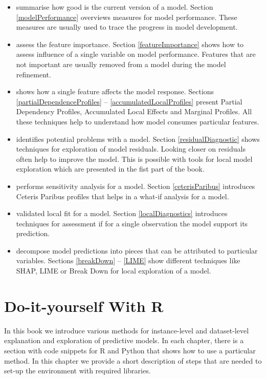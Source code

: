\documentclass[12pt,]{krantz}
\providecommand{\tightlist}{%
  \setlength{\itemsep}{0pt}\setlength{\parskip}{0pt}}
\begin{document}
\begin{itemize}
\tightlist
\item
  summarise how good is the current version of a model. Section \ref{modelPerformance} overviews measures for model performance. These measures are usually used to trace the progress in model development.
\item
  assess the feature importance. Section \ref{featureImportance} shows how to assess influence of a single variable on model performance. Features that are not important are usually removed from a model during the model refinement.
\item
  shows how a single feature affects the model response. Sections \ref{partialDependenceProfiles} -- \ref{accumulatedLocalProfiles} present Partial Dependency Profiles, Accumulated Local Effects and Marginal Profiles. All these techniques help to understand how model consumes particular features.
\item
  identifies potential problems with a model. Section \ref{residualDiagnostic} shows techniques for exploration of model residuals. Looking closer on residuals often help to improve the model. This is possible with tools for local model exploration which are presented in the fist part of the book.
\item
  performs sensitivity analysis for a model. Section \ref{ceterisParibus} introduces Ceteris Paribus profiles that helps in a what-if analysis for a model.
\item
  validated local fit for a model. Section \ref{localDiagnostics} introduces techniques for assessment if for a single observation the model support its prediction.
\item
  decompose model predictions into pieces that can be attributed to particular variables. Sections \ref{breakDown} -- \ref{LIME} show different techniques like SHAP, LIME or Break Down for local exploration of a model.
\end{itemize}

\hypertarget{doItYourselfWithR}{%
\section{Do-it-yourself With R}\label{doItYourselfWithR}}

In this book we introduce various methods for instance-level and dataset-level explanation and exploration of predictive models. In each chapter, there is a section with code snippets for R and Python that shows how to use a particular method. In this chapter we provide a short description of steps that are needed to set-up the environment with required libraries.
\end{document}

